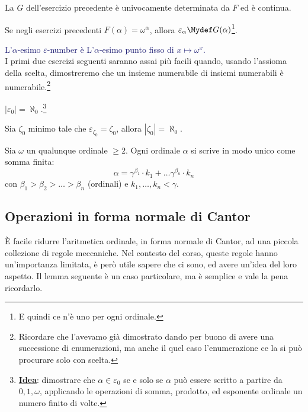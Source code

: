 \documentclass[11pt]{scrartcl}
\begin{document}
\begin{exercise}
	La $G$ dell'esercizio precedente è univocamente determinata da $F$ ed è continua.
\end{exercise}

\begin{definition}
	Se negli esercizi precedenti $F(\alpha) = \omega^\alpha$, allora $\varepsilon_{\alpha} \Mydef G(\alpha)$\footnote{E quindi ce n'è uno per ogni ordinale.}.
\end{definition}

\textcolor{MidnightBlue}{L'$\alpha$-esimo $\varepsilon$-number è L'$\alpha$-esimo punto fisso di $x \mapsto \omega^x$.}\\
I primi due esercizi seguenti saranno assai più facili quando, usando l'assioma della scelta, dimostreremo che un insieme numerabile di insiemi numerabili è numerabile.\footnote{Ricordare che l'avevamo già dimostrato dando per buono di avere una successione di enumerazioni,
ma anche il quel caso l'enumerazione ce la si può procurare solo con scelta.}

\begin{exercise}[\textcolor{red}{$\star$ Difficile senza leggere l'idea sotto}]
	$|\varepsilon_0| = \aleph_0$.\footnote{\underline{\textbf{Idea}}: dimostrare che $\alpha \in \varepsilon_0$ se e solo se $\alpha$ può essere scritto a partire da $0,1,\omega$, applicando le operazioni di somma, prodotto, ed esponente ordinale un numero finito di volte.}
\end{exercise}

\begin{exercise}[\textcolor{red}{$\star \star$ Ostico}]
	Sia $\zeta_0$ minimo tale che $\varepsilon_{\zeta_0} = \zeta_0$, allora $|\zeta_0| = \aleph_0$.
\end{exercise}

\begin{exercise}
	Sia $\omega$ un qualunque ordinale $\geq 2$. Ogni ordinale $\alpha$ si scrive in modo unico come somma finita:
	\[ \alpha = \gamma^{\beta_1}\cdot k_1 + \ldots \gamma^{\beta_n}\cdot k_n
		\]
	con $\beta_1 > \beta_2 > \ldots > \beta_n$ (ordinali) e $k_1,\ldots,k_n < \gamma$.
\end{exercise}

\subsection{Operazioni in forma normale di Cantor}
È facile ridurre l'aritmetica ordinale, in forma normale di Cantor, ad una piccola collezione di regole meccaniche.
Nel contesto del corso, queste regole hanno un'importanza limitata, è però utile sapere che ci sono, ed avere un'idea del loro aspetto.
Il lemma seguente è un caso particolare, ma è semplice e vale la pena ricordarlo.
\end{document}

